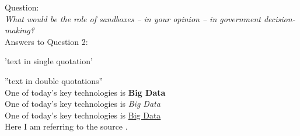 Question:\\
\emph{
    What would be the role of sandboxes – in your opinion – in government decision-making?
}\\

Answers to Question 2:

'text in single quotation'

''text in double quotations''\\

One of today’s key technologies is \textbf{Big Data}\\
One of today’s key technologies is \textit{Big Data}\\
One of today’s key technologies is \underline{Big Data}\\

Here I am referring to the source \cite{BigData}.